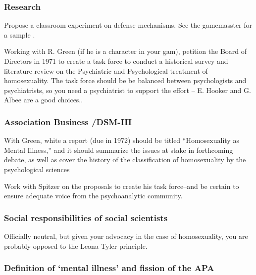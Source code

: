 \begin{refsection}
\subsubsection{Research}
\label{research}

\begin{researchtask}[Spiegel]\label{researchtask:spiegel}Propose a classroom experiment on defense mechanisms. See the gamemasster for a sample .\end{researchtask}

Working with R. Green (if he is a character in your gam), petition the Board of Directors in 1971 to create a task force to conduct a historical survey and literature review on the Psychiatric and Psychological treatment of homosexuality. The task force should be be balanced between psychologists and psychiatrists, so you need a psychiatrist to support the effort – E. Hooker and G. Albee are a good choices..

\subsubsection{Association Business \slash  DSM-III}
\label{associationbusinessdsm-iii}

\begin{writingtask}[Spiegel]\label{writingtask:spiegel}
With Green, white a report (due in 1972) should be titled “Homosexuality as Mental Illness,” and it should summarize the issues at stake in forthcoming debate, as well as cover the history of the classification of homosexuality by the psychological sciences
\end{writingtask}

Work with Spitzer on the proposals to create his task force--and be certain to ensure adequate voice from the psychoanalytic community.

\subsubsection{Social responsibilities of social scientists}
\label{socialresponsibilitiesofsocialscientists}

Officially neutral, but given your advocacy in the case of homosexuality, you are probably opposed to the Leona Tyler principle.

\subsubsection{Definition of ‘mental illness’ and fission of the APA}
\label{definitionof‘mentalillness’andfissionoftheapa}


\end{refsection}
